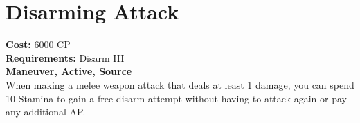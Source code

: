 \section{Disarming Attack}
\textbf{Cost:} 6000 CP\\
\textbf{Requirements:} Disarm III\\
\textbf{Maneuver, Active, Source}\\
When making a melee weapon attack that deals at least 1 damage, you can spend 10 Stamina to gain a free disarm attempt without having to attack again or pay any additional AP.\\
